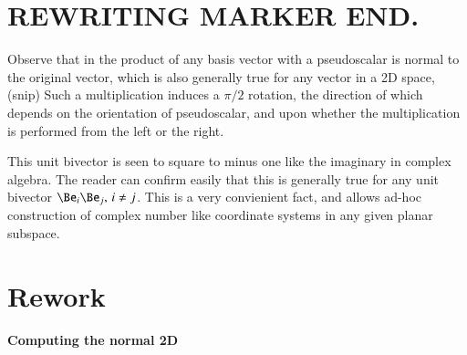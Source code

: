


\section{REWRITING MARKER END.}

Observe that in  the product of any basis vector with a pseudoscalar is normal to the original vector, which is also generally true for any vector in a 2D space,
(snip)
Such a multiplication induces a \( \pi/2 \) rotation, the direction of which depends on the orientation of pseudoscalar, and upon whether the multiplication is performed from the left or the right.

This unit bivector is seen to square to minus one like the imaginary in complex algebra.
The reader can confirm easily that this is generally true for any unit bivector \( \Be_i \Be_j, \, i \ne j \).
This is a very convienient fact, and allows ad-hoc construction of complex number like coordinate systems in any given planar subspace.

\section{Rework}
\paragraph{Computing the normal 2D}

